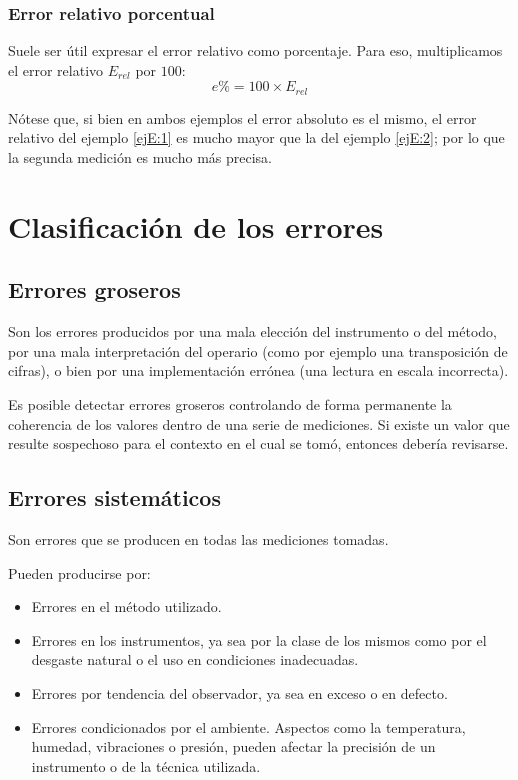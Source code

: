 \subsubsection{Error relativo porcentual}

Suele ser útil expresar el error relativo como porcentaje. Para eso, multiplicamos el error relativo $E_{rel}$ por $100$: $$ e\% = 100 \times E_{rel} $$


Nótese que, si bien en ambos ejemplos el error absoluto es el mismo, el error relativo del ejemplo \ref{ejE:1} es mucho mayor que la del ejemplo \ref{ejE:2}; por lo que la segunda medición es mucho más precisa.

\section{Clasificación de los errores}
\subsection{Errores groseros}
Son los errores producidos por una mala elección del instrumento o del método, por una mala interpretación del operario (como por ejemplo una transposición de cifras), o bien por una implementación errónea (una lectura en escala incorrecta).

Es posible detectar errores groseros controlando de forma permanente la coherencia de los valores dentro de una serie de mediciones. Si existe un valor que resulte sospechoso para el contexto en el cual se tomó, entonces debería revisarse.

\subsection{Errores sistemáticos}

Son errores que se producen en todas las mediciones tomadas.

Pueden producirse por:
\begin{itemize}
	\item Errores en el método utilizado.
	\item Errores en los instrumentos, ya sea por la clase de los mismos como por el desgaste natural o el uso en condiciones inadecuadas.
	\item Errores por tendencia del observador, ya sea en exceso o en defecto.
	\item Errores condicionados por el ambiente. Aspectos como la temperatura, humedad, vibraciones o presión, pueden afectar la precisión de un instrumento o de la técnica utilizada.
\end{itemize}
